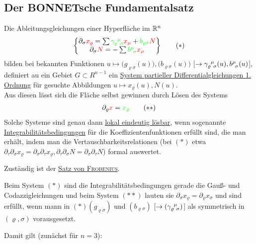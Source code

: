 \subsection{Der BONNETsche Fundamentalsatz}
Die Ableitungsgleichungen einer Hyperfläche im \(\mathbb{R}^n\) 
\begin{align*}
 \begin{Bmatrix}
  \partial_\sigma {\color{red}x_\varrho} = \sum {\color{green}\gamma_{\varrho \;\, \sigma}^{\;\, \mu}} {\color{red}x_\mu} + {\color{green}b_{\varrho \sigma}} {\color{red}N} \\
  \partial_\sigma {\color{red}N} = - \sum {\color{green}b^{\mu}_{\;\, \sigma}} {\color{red}x_\mu}  
 \end{Bmatrix} \tag {\(\ast\)}
\end{align*}
bilden bei {\color{green}bekannten} Funktionen \(u \mapsto \big(g_{\varrho \sigma}(u)\big), \big(b_{\varrho \sigma}(u)\big)\) [\(\to \gamma_{\varrho \;\, \sigma}^{\;\, \mu} (u), b^{\mu}_{\;\, \sigma} (u)\)], definiert au ein Gebiet \(G \subset R^{n-1}\) ein \uline{System partieller Differentialgleichungen 1. Ordnung} für {\color{red}gesuchte} Abbildungen \(u \mapsto x_\varrho(u), N(u)\). \\
Aus diesen lässt sich die Fläche selbst gewinnen durch Lösen des Systems
\begin{align*}
 \partial_\varrho {\color{red}x} = {\color{green}x_{\varrho}} \tag{\(\ast \ast\)}
\end{align*}
Solche Systeme sind genau dann \uline{lokal eindeutig lösbar}, wenn sogenannte \uline{Integrabilitätsbedingungen} für die Koeffizientenfunktionen erfüllt sind, die man erhält, indem man die Vertauschbarkeitsrelationen (bei \((\ast)\) etwa \(\partial_\tau \partial_\sigma x_\varrho = \partial_\sigma \partial_\tau x_\varrho, \partial_\tau \partial_\sigma N = \partial_\sigma \partial_\tau N\)) formal auswertet.\par
Zuständig ist der \uline{Satz von \textsc{Frobenius}}. \par
Beim System \((\ast)\) sind die Integrabilitätsbedingungen gerade die Gauß- und Codazzigleichungen und beim System \((\ast \ast)\) lauten sie \(\partial_\sigma x_\varrho = \partial_\varrho x_\sigma\) und sind erfüllt, wenn mann in \((\ast) (g_{\varrho \sigma})\) und \((b_{\varrho \sigma})\) [\(\to (\gamma_{\varrho \;\, \sigma}^{\;\, \mu})\)] als symmetrisch in \((\varrho, \sigma)\) vorausgesetzt. \par
Damit gilt (zunächst für \(n = 3\)):

